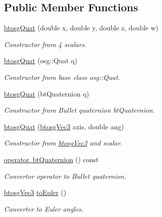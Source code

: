 \subsection*{Public Member Functions}
\begin{DoxyCompactItemize}
\item 
\mbox{\hyperlink{classbtosgQuat_a8ef8fc0d1503426d5e0ead87edfa5acf}{btosg\+Quat}} (double x, double y, double z, double w)
\begin{DoxyCompactList}\small\item\em Constructor from 4 scalars. \end{DoxyCompactList}\item 
\mbox{\hyperlink{classbtosgQuat_aa7646a03371b8aaa2caeba3f4b198ad6}{btosg\+Quat}} (osg\+::\+Quat q)
\begin{DoxyCompactList}\small\item\em Constructor from base class osg\+::\+Quat. \end{DoxyCompactList}\item 
\mbox{\hyperlink{classbtosgQuat_a9fc1530e0eb06c2432f1633bf08db8a2}{btosg\+Quat}} (bt\+Quaternion q)
\begin{DoxyCompactList}\small\item\em Constructor from Bullet quaternion bt\+Quaternion. \end{DoxyCompactList}\item 
\mbox{\hyperlink{classbtosgQuat_a25cb8f2aee828fbfe5dc8113c890bbdb}{btosg\+Quat}} (\mbox{\hyperlink{classbtosgVec3}{btosg\+Vec3}} axis, double ang)
\begin{DoxyCompactList}\small\item\em Constructor from \mbox{\hyperlink{classbtosgVec3}{btosg\+Vec3}} and scalar. \end{DoxyCompactList}\item 
\mbox{\hyperlink{classbtosgQuat_addfd68e2130ff8bb51c582524de5a345}{operator bt\+Quaternion}} () const
\begin{DoxyCompactList}\small\item\em Convertor operator to Bullet quaternion. \end{DoxyCompactList}\item 
\mbox{\hyperlink{classbtosgVec3}{btosg\+Vec3}} \mbox{\hyperlink{classbtosgQuat_aeda394d825b449ab87a77820aad1737d}{to\+Euler}} ()
\begin{DoxyCompactList}\small\item\em Converter to Euler angles. \end{DoxyCompactList}\end{DoxyCompactItemize}


